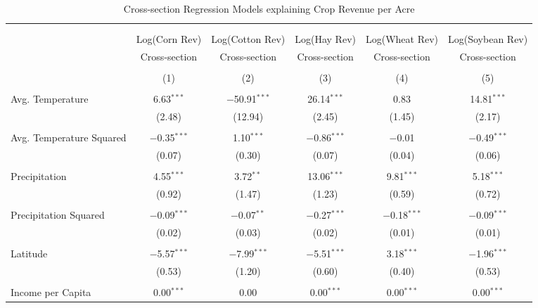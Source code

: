 \documentclass[10pt]{article}
\begin{document}
\begin{table}[!htbp] \centering 
  \caption{Cross-section Regression Models explaining Crop Revenue per Acre} 
  \label{} 
\footnotesize 
\begin{tabular}{@{\extracolsep{5pt}}lccccc} 
\\[-1.8ex]\hline 
\hline \\[-1.8ex] 
\\[-1.8ex] & Log(Corn Rev) & Log(Cotton Rev) & Log(Hay Rev) & Log(Wheat Rev) & Log(Soybean Rev) \\ 
 & Cross-section & Cross-section & Cross-section & Cross-section & Cross-section \\ 
\\[-1.8ex] & (1) & (2) & (3) & (4) & (5)\\ 
\hline \\[-1.8ex] 
 Avg. Temperature & 6.63$^{***}$ & $-$50.91$^{***}$ & 26.14$^{***}$ & 0.83 & 14.81$^{***}$ \\ 
  & (2.48) & (12.94) & (2.45) & (1.45) & (2.17) \\ 
  & & & & & \\ 
 Avg. Temperature Squared & $-$0.35$^{***}$ & 1.10$^{***}$ & $-$0.86$^{***}$ & $-$0.01 & $-$0.49$^{***}$ \\ 
  & (0.07) & (0.30) & (0.07) & (0.04) & (0.06) \\ 
  & & & & & \\ 
 Precipitation & 4.55$^{***}$ & 3.72$^{**}$ & 13.06$^{***}$ & 9.81$^{***}$ & 5.18$^{***}$ \\ 
  & (0.92) & (1.47) & (1.23) & (0.59) & (0.72) \\ 
  & & & & & \\ 
 Precipitation Squared & $-$0.09$^{***}$ & $-$0.07$^{**}$ & $-$0.27$^{***}$ & $-$0.18$^{***}$ & $-$0.09$^{***}$ \\ 
  & (0.02) & (0.03) & (0.02) & (0.01) & (0.01) \\ 
  & & & & & \\ 
 Latitude & $-$5.57$^{***}$ & $-$7.99$^{***}$ & $-$5.51$^{***}$ & 3.18$^{***}$ & $-$1.96$^{***}$ \\ 
  & (0.53) & (1.20) & (0.60) & (0.40) & (0.53) \\ 
  & & & & & \\ 
 Income per Capita & 0.00$^{***}$ & 0.00 & 0.00$^{***}$ & 0.00$^{***}$ & 0.00$^{***}$ \\ 

\end{tabular}
\end{table}
\end{document}
